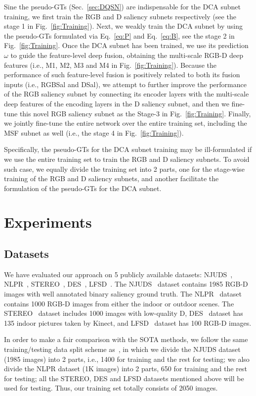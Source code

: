 \documentclass[journal]{IEEEtran}
\begin{document}
Sine the pseudo-GTs (Sec.~\ref{sec:DQSN}) are indispensable for the DCA subnet training, we first train the RGB and D
saliency subnets respectively (see the stage 1 in Fig.~\ref{fig:Training}).
Next, we weakly train the DCA subnet by using the pseudo-GTs formulated via Eq.~\ref{eq:P} and Eq.~\ref{eq:B}, see the stage 2 in Fig.~\ref{fig:Training}.
Once the DCA subnet has been trained, we use its prediction $\omega$ to guide the feature-level deep fusion, obtaining the multi-scale RGB-D deep features (i.e., M1, M2, M3 and M4 in Fig.~\ref{fig:Training}).
Because the performance of such feature-level fusion is positively related to both its fusion inputs (i.e., RGBSal and DSal), we attempt to further improve the performance of the RGB saliency subnet by connecting its encoder layers with the multi-scale deep features of the encoding layers in the D saliency subnet, and then we fine-tune this novel RGB saliency subnet as the Stage-3 in Fig.~\ref{fig:Training}.
Finally, we jointly fine-tune the entire network over the entire training set, including the MSF subnet as well (i.e., the stage 4 in Fig.~\ref{fig:Training}).

Specifically, the pseudo-GTs for the DCA subnet training may be ill-formulated if we use the entire training set to train the RGB and D saliency subnets.
To avoid such case, we equally divide the training set into 2 parts, one for the stage-wise training of the RGB and D saliency subnets, and another facilitate the formulation of the pseudo-GTs for the DCA subnet.


\section{Experiments}
\subsection{Datasets}
We have evaluated our approach on 5 publicly available datasets: NJUDS~\cite{ICIP_J2014}, NLPR~\cite{ECCV_P2014}, STEREO~\cite{SSB}, DES~\cite{DES}, LFSD~\cite{LFSD}.
The NJUDS~\cite{ICIP_J2014} dataset contains 1985 RGB-D images with well annotated binary saliency ground truth.
The NLPR~\cite{ECCV_P2014} dataset contains 1000 RGB-D images from either the indoor or outdoor scenes.
The STEREO~\cite{SSB} dataset includes 1000 images with low-quality D, DES~\cite{DES} dataset has 135 indoor pictures taken by Kinect, and LFSD~\cite{LFSD} dataset has 100 RGB-D images.

In order to make a fair comparison with the SOTA methods, we follow the same training/testing data split scheme as~\cite{zhao2019contrast}, in which we divide the NJUDS dataset (1985 images) into 2 parts, i.e., 1400 for training and the rest for testing; we also divide the NLPR dataset (1K images) into 2 parts, 650 for training and the rest for testing; all the STEREO, DES and LFSD datasets mentioned above will be used for testing.
Thus, our training set totally consists of 2050 images.
\end{document}
